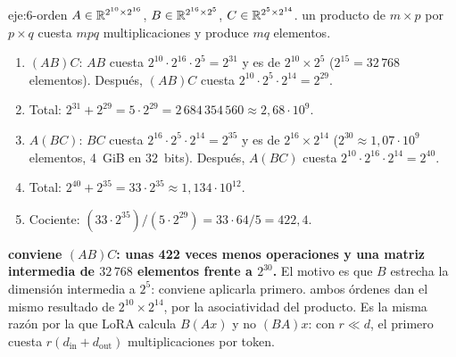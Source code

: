 \begin{solucion}{eje:6-orden}
\datos $A\in\mathbb{R}^{2^{10}\times 2^{16}}$, $B\in\mathbb{R}^{2^{16}\times 2^{5}}$, $C\in\mathbb{R}^{2^{5}\times 2^{14}}$.
\planteamiento un producto de $m\times p$ por $p\times q$ cuesta $mpq$ multiplicaciones y produce $mq$ elementos.
\pasos
\begin{enumerate}[label=\arabic*.]
  \item $(AB)C$: $AB$ cuesta $2^{10}\cdot 2^{16}\cdot 2^{5}=2^{31}$ y es de $2^{10}\times 2^{5}$ ($2^{15}=32\,768$ elementos). Después, $(AB)C$ cuesta $2^{10}\cdot 2^{5}\cdot 2^{14}=2^{29}$.
  \item Total: $2^{31}+2^{29}=5\cdot 2^{29}=2\,684\,354\,560\approx 2{,}68\cdot 10^{9}$.
  \item $A(BC)$: $BC$ cuesta $2^{16}\cdot 2^{5}\cdot 2^{14}=2^{35}$ y es de $2^{16}\times 2^{14}$ ($2^{30}\approx 1{,}07\cdot 10^{9}$ elementos, 4~GiB en 32~bits). Después, $A(BC)$ cuesta $2^{10}\cdot 2^{16}\cdot 2^{14}=2^{40}$.
  \item Total: $2^{40}+2^{35}=33\cdot 2^{35}\approx 1{,}134\cdot 10^{12}$.
  \item Cociente: $(33\cdot 2^{35})/(5\cdot 2^{29})=33\cdot 64/5=422{,}4$.
\end{enumerate}
\resultado \textbf{conviene $(AB)C$: unas 422 veces menos operaciones y una matriz intermedia de $32\,768$ elementos frente a $2^{30}$.} El motivo es que $B$ estrecha la dimensión intermedia a $2^{5}$: conviene aplicarla primero.
\comprobacion ambos órdenes dan el mismo resultado de $2^{10}\times 2^{14}$, por la asociatividad del producto. Es la misma razón por la que LoRA calcula $B(Ax)$ y no $(BA)x$: con $r\ll d$, el primero cuesta $r(d_{\text{in}}+d_{\text{out}})$ multiplicaciones por token.
\end{solucion}


